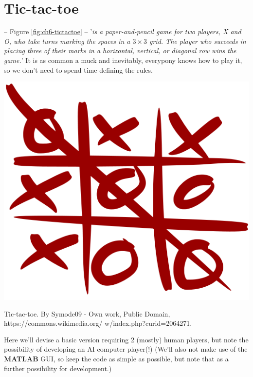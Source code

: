 \documentclass{tufte-book} %
\begin{document}

\newpage


\section{Tic-tac-toe}

\vspace{-4mm}
 -- Figure \ref{fig:ch6-tictactoe} -- '\textit{is a paper-and-pencil game for two players, X and O, who take turns marking the spaces in a \(3\times3\) grid. The player who succeeds in placing three of their marks in a horizontal, vertical, or diagonal row wins the game.}' It is as common a muck and inevitably, everypony knows how to play it, so we don't need to spend time defining the rules.

\begin{marginfigure}[0.0in]
\includegraphics[width=\linewidth]{ch6-tictactoe.png}
\caption{Tic-tac-toe. By Symode09 - Own work, Public Domain, https://commons.wikimedia.org/
w/index.php?curid=2064271.}
\label{fig:ch6-tictactoe}
\end{marginfigure}

Here we'll devise a basic version requiring 2 (mostly) human players, but note the possibility of developing an AI computer player(!) (We'll also  not make use of the \textbf{MATLAB} GUI, so keep the code as simple as possible, but note that as a further possibility for development.)
\end{document}
